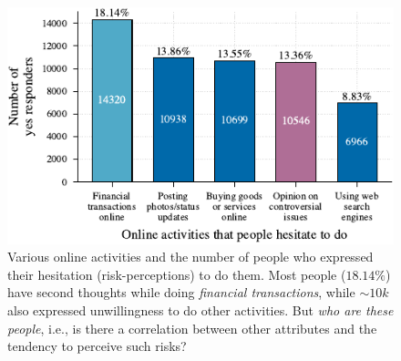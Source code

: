 \documentclass{article}
\theoremstyle{plain}
\theoremstyle{definition}
\theoremstyle{remark}
\newcommand{\swagatam}[1]{{\color{orange}\bf [SH: #1]}}
\begin{document}

    
    

\begin{figure}[t]
\includegraphics{tex/figures/activity_distribution_2021.pdf}
    \caption{Various online activities and the number of people who expressed their hesitation (risk-perceptions) to do them. Most people ($18.14\%$) have second thoughts while doing \emph{financial transactions}, while $\sim10k$ also expressed unwillingness to do other activities. But \emph{who are these people}, i.e., is there a correlation between other attributes and the tendency to perceive such risks?}
    \label{fig:activity-distribution}
\end{figure}
\end{document}
